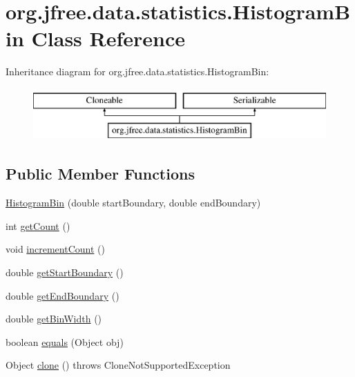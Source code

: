 \hypertarget{classorg_1_1jfree_1_1data_1_1statistics_1_1_histogram_bin}{}\section{org.\+jfree.\+data.\+statistics.\+Histogram\+Bin Class Reference}
\label{classorg_1_1jfree_1_1data_1_1statistics_1_1_histogram_bin}
Inheritance diagram for org.\+jfree.\+data.\+statistics.\+Histogram\+Bin\+:\begin{figure}[H]
\begin{center}
\leavevmode
\includegraphics[height=2.000000cm]{classorg_1_1jfree_1_1data_1_1statistics_1_1_histogram_bin}
\end{center}
\end{figure}
\subsection*{Public Member Functions}
\begin{DoxyCompactItemize}
\item 
\mbox{\hyperlink{classorg_1_1jfree_1_1data_1_1statistics_1_1_histogram_bin_a12555c76fd561f9c7f3ed59a45502852}{Histogram\+Bin}} (double start\+Boundary, double end\+Boundary)
\item 
int \mbox{\hyperlink{classorg_1_1jfree_1_1data_1_1statistics_1_1_histogram_bin_a501f26d63ebe93b2102bdbc6a5bc1372}{get\+Count}} ()
\item 
void \mbox{\hyperlink{classorg_1_1jfree_1_1data_1_1statistics_1_1_histogram_bin_a65d3151baaf469de0b2ac7e5567fdd1e}{increment\+Count}} ()
\item 
double \mbox{\hyperlink{classorg_1_1jfree_1_1data_1_1statistics_1_1_histogram_bin_a7d0a89c94a7ebebbf1ad5bb6f869aef1}{get\+Start\+Boundary}} ()
\item 
double \mbox{\hyperlink{classorg_1_1jfree_1_1data_1_1statistics_1_1_histogram_bin_abbd439fb4580b7a7342972113386f957}{get\+End\+Boundary}} ()
\item 
double \mbox{\hyperlink{classorg_1_1jfree_1_1data_1_1statistics_1_1_histogram_bin_a865d88dd649473a8a3b596992ef280ea}{get\+Bin\+Width}} ()
\item 
boolean \mbox{\hyperlink{classorg_1_1jfree_1_1data_1_1statistics_1_1_histogram_bin_a60652c9f6fdb2eb763c50f6660b2f371}{equals}} (Object obj)
\item 
Object \mbox{\hyperlink{classorg_1_1jfree_1_1data_1_1statistics_1_1_histogram_bin_a51f83a5f00988ee6190012e42d23eef8}{clone}} ()  throws Clone\+Not\+Supported\+Exception 
\end{DoxyCompactItemize}



